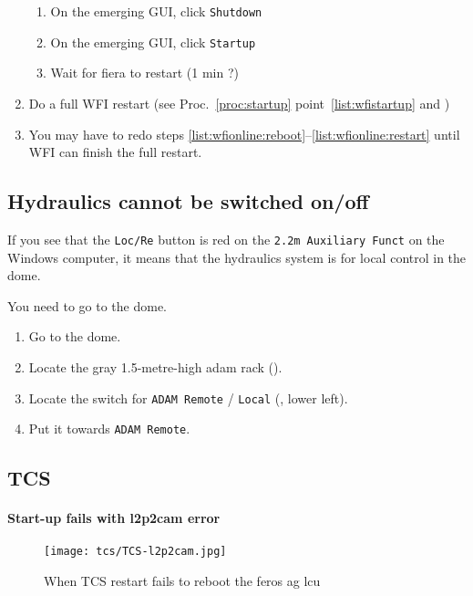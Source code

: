 \documentclass[11pt,fleqn,a4paper]{book}
\begin{document}
\begin{enumerate}
\begin{enumerate}
                \item On the emerging GUI, click \texttt{Shutdown}
                \item On the emerging GUI, click \texttt{Startup}
		\item Wait for \gls{fiera} to restart (1 min ?)
        \end{enumerate}
  \item\label{list:wfionline:restart} Do a full WFI restart (see Proc.~\ref{proc:startup} point~\ref{list:wfistartup} and )
  \item You may have to redo steps \ref{list:wfionline:reboot}--\ref{list:wfionline:restart} until WFI can finish the full restart.
\end{enumerate}


\subsection{Hydraulics cannot be switched on/off}
\label{sec:hydr-loc}
If you see that the \texttt{Loc/Re} button is red on the \texttt{2.2m Auxiliary Funct} on the Windows computer, it means that the hydraulics system is for local control in the dome.

You need to go to the dome.

\begin{enumerate}
   \item Go to the dome.
   \item Locate the gray 1.5-metre-high \gls{adam} rack ().
   \item Locate the switch for \texttt{ADAM Remote} / \texttt{Local} (, lower left).
   \item Put it towards \texttt{ADAM Remote}.
\end{enumerate}

\subsection{TCS}
\paragraph{Start-up fails with \gls{l2p2cam} error}
\begin{figure}
    \centering
    \texttt{[image: tcs/TCS-l2p2cam.jpg]}
    \caption[TCS restart failing to reboot the FEROS AG LCU]{When TCS restart fails to reboot the \gls{feros} \gls{ag} \gls{lcu}}
\end{figure}
\end{document}
